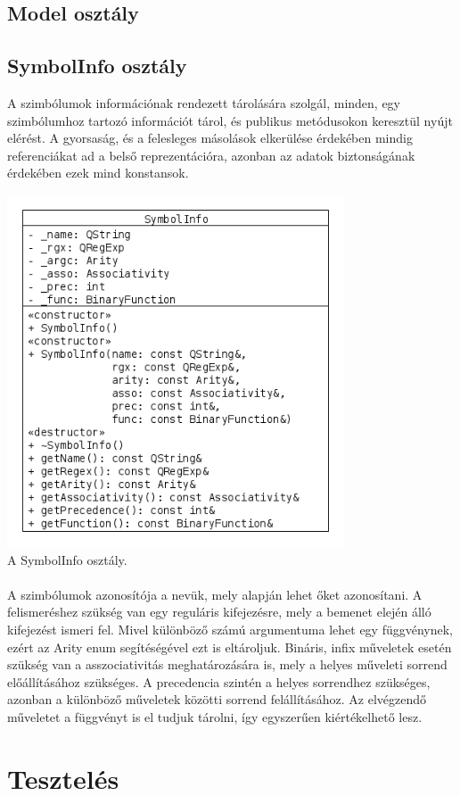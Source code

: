 \documentclass{elteikthesis}
\begin{document}
\subsection{Model osztály}
\subsection{SymbolInfo osztály}
A szimbólumok információnak rendezett tárolására szolgál, minden, egy szimbólumhoz tartozó információt tárol, és publikus metódusokon keresztül nyújt elérést. A gyorsaság, és a felesleges másolások elkerülése érdekében mindig referenciákat ad a belső reprezentációra, azonban az adatok biztonságának érdekében ezek mind konstansok.
\begin{center}
\includegraphics[width=10cm]{pics/SymbolInfo}\\
{\footnotesize A SymbolInfo osztály.}
\end{center}
\paragraph{}
A szimbólumok azonosítója a nevük, mely alapján lehet őket azonosítani. A felismeréshez szükség van egy reguláris kifejezésre, mely a bemenet elején álló kifejezést ismeri fel. Mivel különböző számú argumentuma lehet egy függvénynek, ezért az Arity enum segítéségével ezt is eltároljuk. Bináris, infix műveletek esetén szükség van a asszociativitás meghatározására is, mely a helyes műveleti sorrend előállításához szükséges. A precedencia szintén a helyes sorrendhez szükséges, azonban a különböző műveletek közötti sorrend felállításához. Az elvégzendő műveletet a függvényt is el tudjuk tárolni, így egyszerűen kiértékelhető lesz.
\section{Tesztelés}
\end{document}
